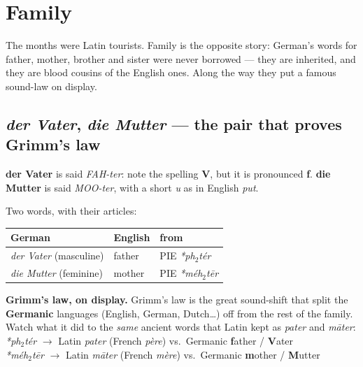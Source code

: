 \chapter{Family}
\label{ch:family}

The months were Latin tourists. Family is the opposite story: German's words
for father, mother, brother and sister were never borrowed --- they are
inherited, and they are blood cousins of the English ones. Along the way they
put a famous sound-law on display.

\section{\emph{der Vater}, \emph{die Mutter} --- the pair that proves Grimm's law}
\label{lesson:eltern}

\begin{sounds}
\textbf{der Vater} is said \emph{FAH-ter}: note the spelling \textbf{V}, but it
is pronounced \textbf{f}. \textbf{die Mutter} is said \emph{MOO-ter}, with a
short \emph{u} as in English \emph{put}.
\end{sounds}

Two words, with their articles:

\begin{center}
\begin{tabular}{@{}lll@{}}
\toprule
German & English & from \\
\midrule
\emph{der Vater} (masculine) & father & PIE \emph{*ph$_2$t\'{e}r} \\
\emph{die Mutter} (feminine) & mother & PIE \emph{*m\'{e}h$_2$t\=er} \\
\bottomrule
\end{tabular}
\end{center}

\begin{grammarlens}
\textbf{Grimm's law, on display.} Grimm's law is the great sound-shift that
split the \textbf{Germanic} languages (English, German, Dutch\ldots) off from
the rest of the family. Watch what it did to the \emph{same} ancient words that
Latin kept as \emph{pater} and \emph{m\=ater}:\\[3pt]
\emph{*ph$_2$t\'{e}r} $\to$ Latin \emph{pater} (French \emph{p\`{e}re}) vs.\
Germanic \textbf{f}ather / \textbf{V}ater\\[3pt]
\emph{*m\'{e}h$_2$t\=er} $\to$ Latin \emph{m\=ater} (French \emph{m\`{e}re})
vs.\ Germanic \textbf{m}other / \textbf{M}utter
\end{grammarlens}

